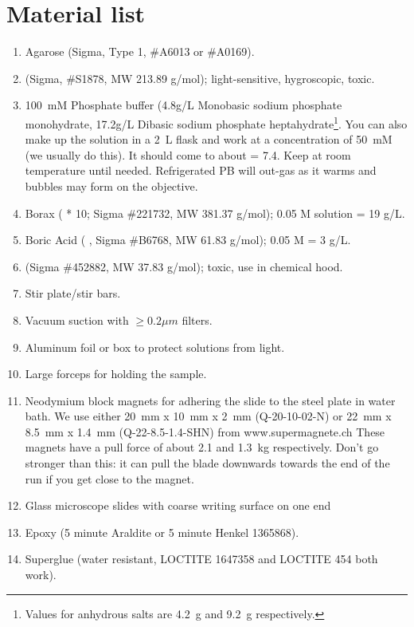\documentclass[paper=a4, fontsize=11pt]{scrartcl} %
\numberwithin{equation}{section} %
\numberwithin{figure}{section} %
\numberwithin{table}{section} %
\begin{document}
\section{Material list}
\begin{enumerate}
\item Agarose (Sigma, Type 1, \#A6013 or \#A0169).
\item {} (Sigma, \#S1878, MW 213.89 g/mol); light-sensitive, hygroscopic, toxic.
\item 100~mM Phosphate buffer (4.8g/L Monobasic sodium phosphate monohydrate, 17.2g/L Dibasic sodium phosphate heptahydrate\footnote{Values for anhydrous salts are 4.2~g and 9.2~g respectively.}. You can also make up the solution in a 2~L flask and work at a concentration of 50~mM (we usually do this). 
It should come to about \pH = 7.4.
Keep at room temperature until needed. 
Refrigerated PB will out-gas as it warms and bubbles may form on the objective. 
\item Borax ( * 10; Sigma \#221732, MW 381.37 g/mol); 0.05 M solution = 19 g/L.
\item Boric Acid ( , Sigma \#B6768, MW 61.83 g/mol); 0.05 M = 3 g/L.
\item {} (Sigma \#452882, MW 37.83 g/mol); toxic, use in chemical hood.
\item Stir plate/stir bars.
\item Vacuum suction with $\ge 0.2 \mu m$ filters.
\item Aluminum foil or box to protect solutions from light. 
\item Large forceps for holding the sample. 
\item Neodymium block magnets for adhering the slide to the steel plate in water bath. 
      We use either 20~mm x 10~mm x 2~mm (Q-20-10-02-N) or 22~mm x 8.5~mm x 1.4~mm (Q-22-8.5-1.4-SHN) from www.supermagnete.ch
      These magnets have a pull force of about 2.1 and 1.3~kg respectively.
      Don't go stronger than this: it can pull the blade downwards towards the end of the run if you get close to the magnet.
\item Glass microscope slides with coarse writing surface on one end
\item Epoxy (5 minute Araldite or 5 minute Henkel 1365868).
\item Superglue (water resistant, LOCTITE 1647358 and LOCTITE 454 both work).
\end{enumerate}
\end{document}
